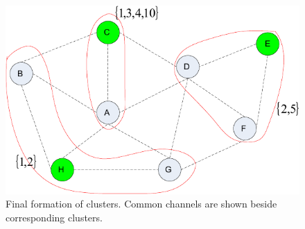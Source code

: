 \documentclass[times]{ettauth}
\theoremstyle{mytheoremstyle}
\theoremstyle{mytheoremstyle}
\theoremstyle{mytheoremstyle}
\begin{document}

\begin{figure}[h]
  \centering
  \includegraphics[width=0.5\linewidth]{final_clustering_ross.pdf}
  \caption{Final formation of clusters. Common channels are shown beside corresponding clusters.}
  \label{final_clustering_ross}
\end{figure}
\end{document}
